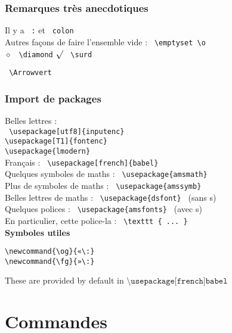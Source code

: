 \documentclass{report}
\begin{document}
\subsubsection*{Remarques très anecdotiques}

Il y a  \texttt{ :} et \texttt{ colon} \\
Autres façons de faire l'ensemble vide : \texttt{ \textbackslash{}emptyset \textbackslash{}o } \\
$ \diamond $ \quad \texttt{ \textbackslash{}diamond} $ \surd $   \texttt{ \textbackslash{}surd}

\texttt{ \textbackslash{}Arrowvert}


\subsubsection*{Import de packages}

Belles lettres : \\
\texttt{
\textbackslash{}usepackage[utf8]\{inputenc\} \\
\textbackslash{}usepackage[T1]\{fontenc\} \\
\textbackslash{}usepackage\{lmodern\}
} \\
Français : \texttt{ \textbackslash{}usepackage[french]\{babel\} } \\
Quelques symboles de maths : \texttt{ \textbackslash{}usepackage\{amsmath\} } \\
Plus de symboles de maths : \texttt{ \textbackslash{}usepackage\{amssymb\} } \\
Belles lettres de maths : \texttt{ \textbackslash{}usepackage\{dsfont\} } (sans s) \\
Quelques polices : \texttt{ \textbackslash{}usepackage\{amsfonts\} } (avec s)\\
En particulier, cette police-la : \texttt{ \textbackslash texttt \{ ... \}}\\

\textbf{Symboles utiles}

\begin{verbatim}
\newcommand{\og}{«\:}
\newcommand{\fg}{»\:}
\end{verbatim}

These are provided by default in $\texttt{\textbackslash usepackage[french]{babel}}$

\newpage

\section*{Commandes}
\end{document}
